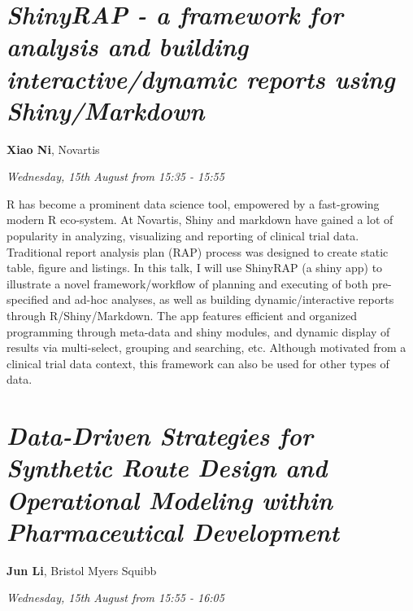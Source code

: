 \documentclass[]{book}
\theoremstyle{definition}
\theoremstyle{definition}
\theoremstyle{definition}
\theoremstyle{remark}
\begin{document}
\hypertarget{shinyrap---a-framework-for-analysis-and-building-interactivedynamic-reports-using-shinymarkdown-1}{%
\section{\texorpdfstring{\emph{ShinyRAP - a framework for analysis and
building interactive/dynamic reports using
Shiny/Markdown}}{ShinyRAP - a framework for analysis and building interactive/dynamic reports using Shiny/Markdown}}\label{shinyrap---a-framework-for-analysis-and-building-interactivedynamic-reports-using-shinymarkdown-1}}

\textbf{Xiao Ni}, Novartis

\emph{Wednesday, 15th August from 15:35 - 15:55}

R has become a prominent data science tool, empowered by a fast-growing
modern R eco-system. At Novartis, Shiny and markdown have gained a lot
of popularity in analyzing, visualizing and reporting of clinical trial
data. Traditional report analysis plan (RAP) process was designed to
create static table, figure and listings. In this talk, I will use
ShinyRAP (a shiny app) to illustrate a novel framework/workflow of
planning and executing of both pre-specified and ad-hoc analyses, as
well as building dynamic/interactive reports through R/Shiny/Markdown.
The app features efficient and organized programming through meta-data
and shiny modules, and dynamic display of results via multi-select,
grouping and searching, etc. Although motivated from a clinical trial
data context, this framework can also be used for other types of data.

\hypertarget{data-driven-strategies-for-synthetic-route-design-and-operational-modeling-within-pharmaceutical-development-1}{%
\section{\texorpdfstring{\emph{Data-Driven Strategies for Synthetic
Route Design and Operational Modeling within Pharmaceutical
Development}}{Data-Driven Strategies for Synthetic Route Design and Operational Modeling within Pharmaceutical Development}}\label{data-driven-strategies-for-synthetic-route-design-and-operational-modeling-within-pharmaceutical-development-1}}

\textbf{Jun Li}, Bristol Myers Squibb

\emph{Wednesday, 15th August from 15:55 - 16:05}
\end{document}
